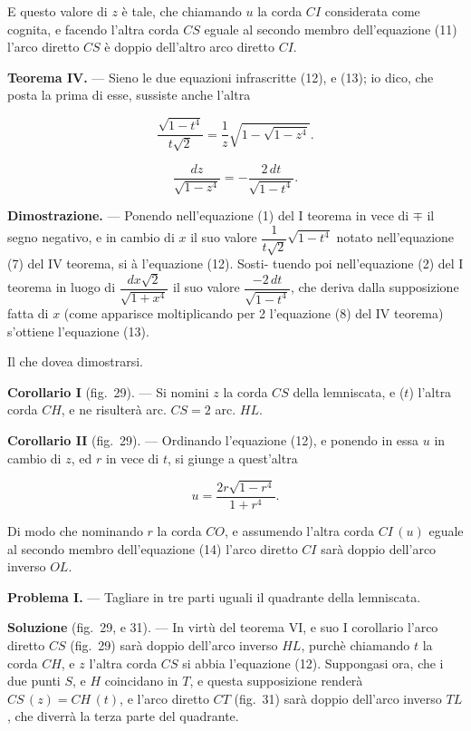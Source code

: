 \documentclass{article}
\begin{document}
E questo valore di $z$ è tale, che chiamando $u$ la corda $CI$ considerata come cognita, e facendo
l'altra corda $CS$ eguale al secondo membro dell'equazione (11) l'arco diretto $CS$ è doppio
dell'altro arco diretto $CI$.

\textbf{Teorema IV.} --- Sieno le due equazioni infrascritte (12), e (13); io dico, che posta la
prima di esse, sussiste anche l'altra

\[ \frac{\sqrt{1-t^{4}}}{t\sqrt{2}} = \frac{1}{z}\sqrt{1-\sqrt{1-z^{4}}}. \tag{12} \]

\[ \frac{dz}{\sqrt{1-z^{4}}} = -\frac{2\,dt}{\sqrt{1-t^{4}}}. \tag{13} \]

\textbf{Dimostrazione.} --- Ponendo nell'equazione (1) del I teorema in vece di $\mp$ il segno
negativo, e in cambio di $x$ il suo valore $\dfrac{1}{t\sqrt{2}}\sqrt{1-t^{4}}$ notato
nell'equazione (7) del IV teorema, si à l'equazione (12). Sosti-
tuendo poi nell'equazione (2) del I teorema in luogo di $\dfrac{dx\sqrt{2}}{\sqrt{1+x^{4}}}$ il suo
valore $\dfrac{-2\,dt}{\sqrt{1-t^{4}}}$, che deriva dalla supposizione fatta di $x$ (come apparisce
moltiplicando per 2 l'equazione (8) del IV teorema) s'ottiene l'equazione (13).

Il che dovea dimostrarsi.

\textbf{Corollario I} (fig.~29). --- Si nomini $z$ la corda $CS$ della lemniscata, e ($t$)
l'altra corda $CH$, e ne risulterà arc. $CS = 2$ arc. $HL$.

\textbf{Corollario II} (fig.~29). --- Ordinando l'equazione (12), e ponendo in essa $u$ in cambio
di $z$, ed $r$ in vece di $t$, si giunge a quest'altra

\[ u = \frac{2r\sqrt{1-r^{4}}}{1+r^{4}}. \tag{14} \]

Di modo che nominando $r$ la corda $CO$, e assumendo l'altra corda $CI\,(u)$ eguale al secondo
membro dell'equazione (14) l'arco diretto $CI$ sarà doppio dell'arco inverso $OL$.

\textbf{Problema I.} --- Tagliare in tre parti uguali il quadrante della lemniscata.

\textbf{Soluzione} (fig.~29, e 31). --- In virtù del teorema VI, e suo I corollario l'arco
diretto $CS$ (fig.~29) sarà doppio dell'arco inverso $HL$, purchè chiamando $t$ la corda $CH$, e
$z$ l'altra corda $CS$ si abbia l'equazione (12). Suppongasi ora, che i due punti $S$, e $H$
coincidano in $T$, e questa supposizione renderà $CS\,(z) = CH\,(t)$, e l'arco diretto $CT$
(fig.~31) sarà doppio dell'arco inverso $TL$, che diverrà la terza parte del quadrante.
\end{document}

